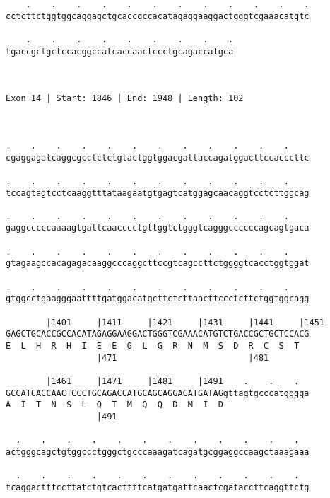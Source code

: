 \documentclass{article}
\begin{document}
\begin{Verbatim}
    .    .    .    .    .    .    .    .    .    .    .    .
cctcttctggtggcaggagctgcaccgccacatagaggaaggactgggtcgaaacatgtc
                                                            
    .    .    .    .    .    .    .    .    .
tgaccgctgctccacggccatcaccaactccctgcagaccatgca
                                             
                                             
 
Exon 14 | Start: 1846 | End: 1948 | Length: 102



.    .    .    .    .    .    .    .    .    .    .    .    
cgaggagatcaggcgcctctctgtactggtggacgattaccagatggacttccacccttc
                                                            
.    .    .    .    .    .    .    .    .    .    .    .    
tccagtagtcctcaaggtttataagaatgtgagtcatggagcaacaggtcctcttggcag
                                                            
.    .    .    .    .    .    .    .    .    .    .    .    
gaggcccccaaaagtgattcaacccctgttggtctgggtcagggccccccagcagtgaca
                                                            
.    .    .    .    .    .    .    .    .    .    .    .    
gtagaagccacagagacaaggcccaggcttccgtcagccttctggggtcacctggtggat
                                                            
.    .    .    .    .    .    .    .    .    .    .    .    
gtggcctgaagggaattttgatggacatgcttctcttaacttccctcttctggtggcagg
                                                            
        |1401     |1411     |1421     |1431     |1441     |1451
GAGCTGCACCGCCACATAGAGGAAGGACTGGGTCGAAACATGTCTGACCGCTGCTCCACG
E  L  H  R  H  I  E  E  G  L  G  R  N  M  S  D  R  C  S  T  
                  |471                          |481        
  
        |1461     |1471     |1481     |1491    .    .    .  
GCCATCACCAACTCCCTGCAGACCATGCAGCAGGACATGATAGgttagtgcccatgggga
A  I  T  N  S  L  Q  T  M  Q  Q  D  M  I  D                 
                  |491                                      
  
  .    .    .    .    .    .    .    .    .    .    .    .  
actgggcagctgtggccctgggctgcccaaagatcagatgcggaggccaagctaaagaaa
                                                            
  .    .    .    .    .    .    .    .    .    .    .    .  
tcaggactttccttatctgtcacttttcatgatgattcaactcgataccttcaggttctg
                                                            

\end{Verbatim}
\end{document}
